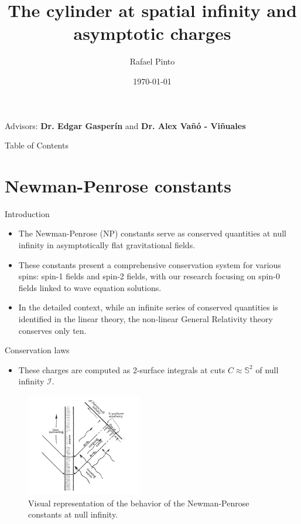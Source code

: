 \documentclass{beamer}
\title[Spin-0 fields NP constants]{The cylinder at spatial infinity and asymptotic charges}
\author[Rafael Pinto]{Rafael Pinto}
\institute[CENTRA-GRIT]{Instituto Superior Técnico}
\date{\today}
\theoremstyle{remark}
\theoremstyle{plain}
\theoremstyle{plain}
\begin{document}
\begin{frame}
  \titlepage
  \vfill
  \begin{center}
    Advisors: \textbf{Dr. Edgar Gasper\'in} and \textbf{Dr. Alex Va\~{n}\'o - Vi\~{n}uales}
  \end{center}
\end{frame}

\begin{frame}{Table of Contents}
  \tableofcontents
\end{frame}

\section{Newman-Penrose constants}
\begin{frame}{Introduction}
  \begin{itemize}
    \item The Newman-Penrose (NP) constants serve as conserved quantities at null infinity in asymptotically flat gravitational fields.
    \item These constants present a comprehensive conservation system for various spins: spin-1 fields and spin-2 fields, with our research focusing on spin-0 fields linked to wave equation solutions.
    \item In the detailed context, while an infinite series of conserved quantities is identified in the linear theory, the non-linear General Relativity theory conserves only ten.
  \end{itemize}
\end{frame}

\begin{frame}{Conservation laws}
  \begin{itemize}
    \item These charges are computed as 2-surface integrals at cuts ${C} \approx \mathbb{S}^2$ of null infinity $\mathscr{I}$.
  \end{itemize}
  \begin{figure}[h]
    \centering \includegraphics[width =0.45\textwidth]{penrose constants.png}
      \caption{Visual representation of the behavior of the Newman-Penrose constants at null infinity.}
  \end{figure}
\end{frame}
\end{document}
